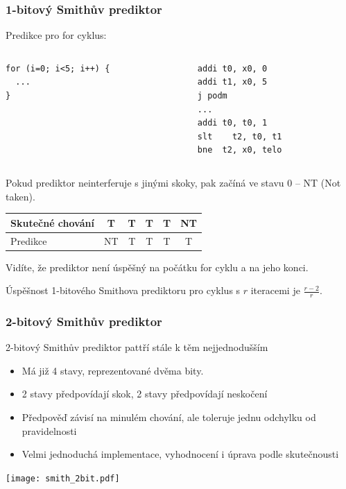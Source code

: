 \documentclass{beamer}
\begin{document}
\begin{frame}[fragile]
\frametitle{1-bitový Smithův prediktor}

Predikce pro for cyklus:

\begin{columns}[T]
\begin{column}{0.4\textwidth}
\begin{verbatim}
for (i=0; i<5; i++) {
  ...
}
\end{verbatim}
\end{column}
\hfill
\begin{column}{0.4\textwidth}
\begin{verbatim}
addi t0, x0, 0
addi t1, x0, 5
j podm
...
addi t0, t0, 1
slt    t2, t0, t1
bne  t2, x0, telo
\end{verbatim}
\end{column}
\end{columns}
\bigskip
Pokud prediktor neinterferuje s jinými skoky, pak začíná ve stavu 0 -- NT (Not taken).

\begin{tabular}{|l|c|c|c|c|c|}\hline
Skutečné chování & T & T & T & T & NT\\ \hline
Predikce         & {\color{red}NT} & T & T & T & {\color{red}T}\\ \hline
\end{tabular}

Vidíte, že prediktor není úspěšný na počátku for cyklu a na jeho konci.

Úspěšnost 1-bitového Smithova prediktoru pro cyklus s $r$ iteracemi je $\frac{r-2}{r}$.
\end{frame}


\begin{frame}
\frametitle{2-bitový Smithův prediktor}

2-bitový Smithův prediktor pattří stále k těm nejjednodušším
\begin{itemize}
\item Má již 4 stavy, reprezentované dvěma bity.
\item 2 stavy předpovídají skok, 2 stavy předpovídají neskočení
\item Předpověď závisí na minulém chování, ale toleruje jednu odchylku od pravidelnosti
\item Velmi jednoduchá implementace, vyhodnocení i úprava podle skutečnousti
\end{itemize}

\begin{center}
\texttt{[image: smith\_2bit.pdf]}
\end{center}
\end{frame}
\end{document}
